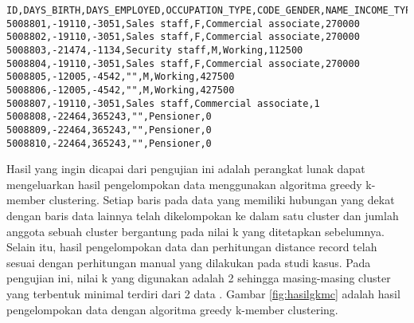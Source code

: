 \begin{lstlisting}[basicstyle=\ttfamily, frame=single,
	columns=fullflexible, keepspaces=true, breaklines=true, label=lst:fungsional_gkmc2, caption=Sampel Data Credit Score]
ID,DAYS_BIRTH,DAYS_EMPLOYED,OCCUPATION_TYPE,CODE_GENDER,NAME_INCOME_TYPE,AMT_INCOME_TOTAL
5008801,-19110,-3051,Sales staff,F,Commercial associate,270000
5008802,-19110,-3051,Sales staff,F,Commercial associate,270000
5008803,-21474,-1134,Security staff,M,Working,112500
5008804,-19110,-3051,Sales staff,F,Commercial associate,270000
5008805,-12005,-4542,"",M,Working,427500
5008806,-12005,-4542,"",M,Working,427500
5008807,-19110,-3051,Sales staff,Commercial associate,1
5008808,-22464,365243,"",Pensioner,0
5008809,-22464,365243,"",Pensioner,0
5008810,-22464,365243,"",Pensioner,0
\end{lstlisting}

\vspace{0.5cm}

Hasil yang ingin dicapai dari pengujian ini adalah perangkat lunak dapat mengeluarkan hasil pengelompokan data menggunakan algoritma greedy k-member clustering. Setiap baris pada data yang memiliki hubungan yang dekat dengan baris data lainnya telah dikelompokan ke dalam satu cluster dan jumlah anggota sebuah cluster bergantung pada nilai k yang ditetapkan sebelumnya. Selain itu, hasil pengelompokan data dan perhitungan distance record telah sesuai dengan perhitungan manual yang dilakukan pada studi kasus. Pada pengujian ini, nilai k yang digunakan adalah 2 sehingga masing-masing cluster yang terbentuk minimal terdiri dari 2 data . Gambar \ref{fig:hasilgkmc} adalah hasil pengelompokan data dengan algoritma greedy k-member clustering.



